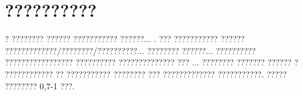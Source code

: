 \usepackage[cp1251]{inputenc}
\chapter*{??????????}


? ???????? ?????? ??????????? ??????... .
??? ??????????? ?????? ?????????????/????????/??????????... ????????
??????... ?????????? ????????????????? ?????????? ?????????????? ???
...
???????? ??????? ?????? ? ???????????? ?? ??????????? ????????
??? ????????????? ???????????.
????? ???????? 0,7-1 ???.
